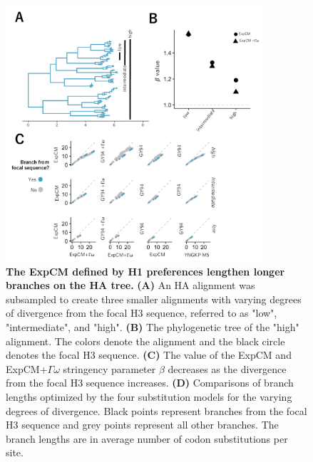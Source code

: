 \documentclass[11pt]{article}
\begin{document}
\begin{figure}[H]
\centerline{\includegraphics[width=0.85\textwidth]{figures/doud_compete}}
\caption{\label{fig:doud_compete}
\textbf{The ExpCM defined by H1 preferences lengthen longer branches on the HA tree.} 
\textbf{(A)} An HA alignment was subsampled to create three smaller alignments with varying degrees of divergence from the focal H3 sequence, referred to as "low", "intermediate", and "high". 
\textbf{(B)} The phylogenetic tree of the "high" alignment. 
The colors denote the alignment and the black circle denotes the focal H3 sequence. 
\textbf{(C)} The value of the ExpCM and ExpCM+$\Gamma\omega$ stringency parameter $\beta$ decreases as the divergence from the focal H3 sequence increases. 
\textbf{(D)} Comparisons of branch lengths optimized by the four substitution models for the varying degrees of divergence. 
Black points represent branches from the focal H3 sequence and grey points represent all other branches.  
The branch lengths are in average number of codon substitutions per site. 
}
\end{figure}
\end{document}
